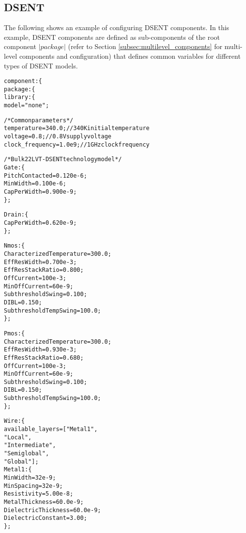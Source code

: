 \subsection{DSENT}
\noindent
The following shows an example of configuring DSENT components. 
In this example, DSENT components are defined as sub-components of the root component $|package|$ (refer to Section \ref{subsec:multilevel_components} for multi-level components and configuration) that defines common variables for different types of DSENT models.
{
\fontsize{10pt}{11pt}\selectfont
\begin{alltt}
component: \{
    package: \{
        library: \{
            model = "none";
            
            /* Common parameters */
            temperature = 340.0; // 340K initial temperature
            voltage = 0.8; // 0.8V supply voltage
            clock_frequency = 1.0e9; // 1GHz clock frequency
            
            /* Bulk22LVT - DSENT technology model */
            Gate: \{
                PitchContacted = 0.120e-6;
                MinWidth = 0.100e-6;
                CapPerWidth = 0.900e-9;
            \};
            
            Drain: \{
                CapPerWidth = 0.620e-9;
            \};
            
            Nmos: \{
                CharacterizedTemperature = 300.0;
                EffResWidth = 0.700e-3;
                EffResStackRatio = 0.800;
                OffCurrent = 100e-3;
                MinOffCurrent = 60e-9;
                SubthresholdSwing = 0.100;
                DIBL = 0.150;
                SubthresholdTempSwing = 100.0;
            \};
            
            Pmos: \{
                CharacterizedTemperature = 300.0;
                EffResWidth = 0.930e-3;
                EffResStackRatio = 0.680;
                OffCurrent = 100e-3;
                MinOffCurrent = 60e-9;
                SubthresholdSwing = 0.100;
                DIBL = 0.150;
                SubthresholdTempSwing = 100.0;
            \};
            
            Wire: \{
                available_layers = ["Metal1", 
                                    "Local", 
                                    "Intermediate", 
                                    "Semiglobal", 
                                    "Global"];
                Metal1: \{
                    MinWidth = 32e-9;
                    MinSpacing = 32e-9;
                    Resistivity = 5.00e-8;
                    MetalThickness = 60.0e-9;
                    DielectricThickness = 60.0e-9;
                    DielectricConstant = 3.00;
                \};
                

\end{alltt}}
